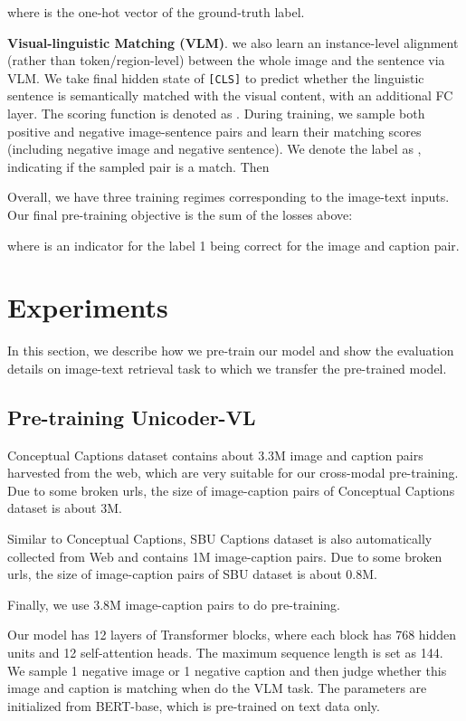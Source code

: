 \documentclass[letterpaper]{article} \usepackage{aaai20}  \usepackage{times}  \usepackage{helvet} \usepackage{courier}  \usepackage[hyphens]{url}  \usepackage{graphicx} \urlstyle{rm} \def\UrlFont{\rm}  \usepackage{graphicx}  \frenchspacing  \setlength{\pdfpagewidth}{8.5in}  \setlength{\pdfpageheight}{11in}  \usepackage{amssymb}
\begin{document}
where  is the one-hot vector of the ground-truth label.

\textbf{Visual-linguistic Matching (VLM)}. we also learn an instance-level alignment (rather than token/region-level) between the whole image and the sentence via VLM. We take final hidden state of \texttt{[CLS]} to predict whether the linguistic sentence is semantically matched with the visual content, with an additional FC layer. The scoring function is denoted as . During training, we sample both positive and negative image-sentence pairs and learn their matching scores (including negative image and negative sentence). We denote the label as , indicating if the sampled pair is a match. Then





Overall, we have three training regimes corresponding to the image-text inputs. Our final pre-training objective is the sum of the losses above:

where  is an indicator for the label 1 being correct for the image and caption pair.

\section{Experiments}

\noindent In this section, we describe how we pre-train our model and show the evaluation details on image-text retrieval task to which we transfer the pre-trained model. 
\subsection{Pre-training Unicoder-VL}

Conceptual Captions dataset \cite{sharma2018conceptual} contains about 3.3M image and caption pairs harvested from the web, which are very suitable for our cross-modal pre-training. Due to some broken urls, the size of image-caption pairs of Conceptual Captions dataset is about 3M.

Similar to Conceptual Captions, SBU Captions  \cite{ordonez2011im2text} dataset is also automatically collected from Web and contains 1M image-caption pairs. Due to some broken urls, the size of image-caption pairs of SBU dataset is about 0.8M. 

Finally, we use 3.8M image-caption pairs to do pre-training.

Our model has 12 layers of Transformer blocks, where each block has 768 hidden units and 12 self-attention heads. The maximum sequence length is set as 144. We sample 1 negative image or 1 negative caption and then judge whether this image and caption is matching when do the VLM task. The parameters are initialized from BERT-base, which is pre-trained on text data only. 
\end{document}
